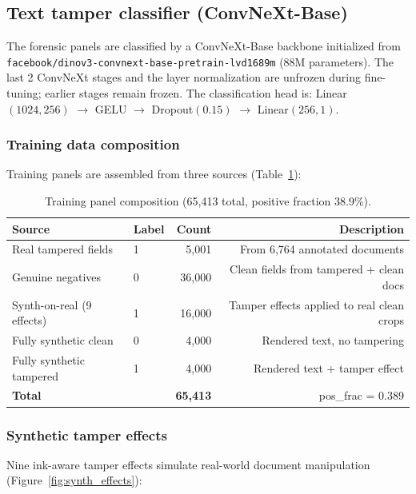 \documentclass[11pt,a4paper]{article}
\begin{document}
\subsection{Text tamper classifier (ConvNeXt-Base)}

The forensic panels are classified by a ConvNeXt-Base backbone initialized from
\texttt{facebook/dinov3-convnext-base-pretrain-lvd1689m} (88M parameters).
The last 2 ConvNeXt stages and the layer normalization are unfrozen during
fine-tuning; earlier stages remain frozen.
The classification head is:
Linear$(1024, 256)$ $\rightarrow$ GELU $\rightarrow$ Dropout$(0.15)$ $\rightarrow$
Linear$(256, 1)$.

\subsubsection{Training data composition}

Training panels are assembled from three sources (Table~\ref{tab:panels}):

\begin{table}[H]
  \centering
  \small
  \caption{Training panel composition (65{,}413 total, positive fraction 38.9\%).}
  \label{tab:panels}
  \begin{tabular}{llrr}
    \toprule
    Source & Label & Count & Description \\
    \midrule
    Real tampered fields       & 1 & 5{,}001 & From 6{,}764 annotated documents \\
    Genuine negatives          & 0 & 36{,}000 & Clean fields from tampered + clean docs \\
    Synth-on-real (9 effects)  & 1 & 16{,}000 & Tamper effects applied to real clean crops \\
    Fully synthetic clean      & 0 & 4{,}000  & Rendered text, no tampering \\
    Fully synthetic tampered   & 1 & 4{,}000  & Rendered text + tamper effect \\
    \midrule
    \textbf{Total}             &   & \textbf{65{,}413} & pos\_frac = 0.389 \\
    \bottomrule
  \end{tabular}
\end{table}

\subsubsection{Synthetic tamper effects}

Nine ink-aware tamper effects simulate real-world document manipulation
(Figure~\ref{fig:synth_effects}):
\end{document}
